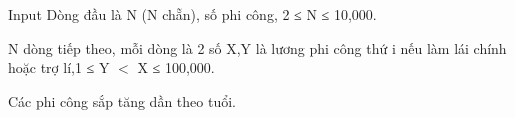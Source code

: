Input
Dòng đầu là N (N chẵn), số phi công, 2 ≤ N ≤ 10,000.  

   N dòng tiếp theo, mỗi dòng là 2 số X,Y là lương phi công thứ i nếu làm lái chính hoặc trợ lí,1 ≤ Y $<$ X ≤ 100,000.  

   Các phi công sắp tăng dần theo tuổi.